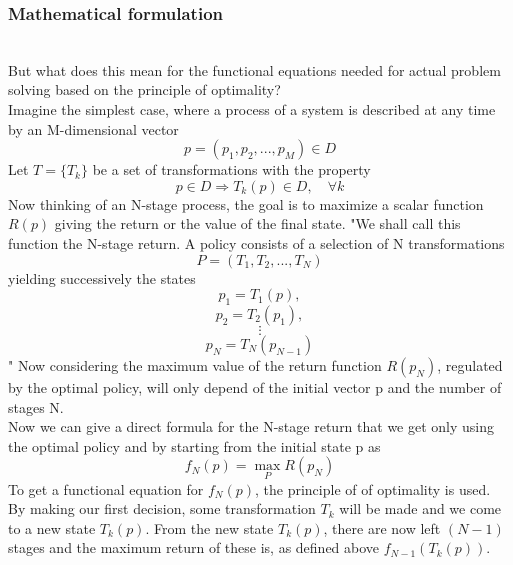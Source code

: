 \documentclass[conference]{IEEEtran}
\begin{document}
\subsubsection{Mathematical formulation} 
\quad \\
But what does this mean for the functional equations needed for actual problem solving based on the principle of optimality?
\\
Imagine the simplest case, where a process of a system is described at any time by an M-dimensional vector
\begin{equation}
p = (p_1, p_2, ..., p_M) \in D
\end{equation}
Let $T = \{T_k\}$ be a set of transformations with the property
\begin{equation}
p \in D \Rightarrow T_k(p) \in D, \quad \forall k
\end{equation}
Now thinking of an N-stage process, the goal is to maximize a scalar function $R(p)$ giving the return or the value of the final state. "We shall call this function the N-stage return. A policy consists of a selection of N transformations 
\begin{equation}
P = (T_1, T_2, ..., T_N)
\end{equation}
yielding successively the states
\begin{equation*}
p_1 = T_1(p),
\end{equation*}
\begin{equation*}
p_2 = T_2(p_1),
\end{equation*}
\begin{equation}
\vdots
\end{equation}
\begin{equation*}
p_N = T_N(p_{N-1})
\end{equation*}
"\cite{Bellman.30.07.1954}
Now considering the maximum value of the return function $R(p_N)$, regulated by the optimal policy, will only depend of the initial vector p and the number of stages N.
\\
Now we can give a direct formula for the N-stage return that we get only using the optimal policy and by starting from the initial state p as
\begin{equation}
f_N(p) = \max_P R(p_N)
\end{equation}
To get a functional equation for $f_N(p)$, the principle of of optimality is used. By making our first decision, some transformation $T_k$ will be made and we come to a new state $T_k(p)$.
From the new state $T_k(p)$, there are now left $(N-1)$ stages and the maximum return of these is, as defined above $f_{N-1}(T_k(p))$. 
\end{document}
